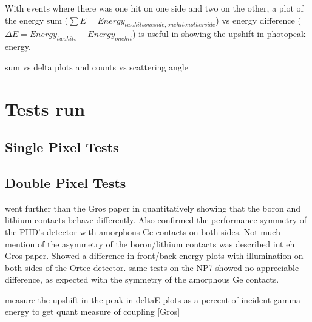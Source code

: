 \indent With events where there was one hit on one side and two on the other, a plot of the energy sum ($\sum E = Energy _{two hits one side, one hit on other side}$) vs energy difference ($\Delta E = Energy _{two hits} - Energy _{one hit}$) is useful in showing the upshift in photopeak energy. \cite{SG09}

sum vs delta plots and counts vs scattering angle

\section{Tests run}
\indent

\subsection{Single Pixel Tests}
\indent

\subsection{Double Pixel Tests}
\indent went further than the Gros paper in quantitatively showing that the boron and lithium contacts behave differently. Also confirmed the performance symmetry of the PHD's detector with amorphous Ge contacts on both sides. Not much mention of the asymmetry of the boron/lithium contacts was described int eh Gros paper. Showed a difference in front/back energy plots with illumination on both sides of the Ortec detector. same tests on the NP7 showed no appreciable difference, as expected with  the symmetry of the amorphous Ge contacts.

measure the upshift in the peak in deltaE plots as a percent of incident gamma energy to get quant measure of coupling [Gros]


